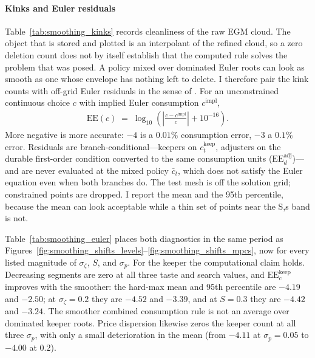 \paragraph{Kinks and Euler residuals}
\label{subsec:ModelBasicEuler}

Table~\ref{tab:smoothing_kinks} records cleanliness of the raw EGM cloud. The object that is stored and plotted is an interpolant of the refined cloud, so a zero deletion count does not by itself establish that the computed rule solves the problem that was posed. A policy mixed over dominated Euler roots can look as smooth as one whose envelope has nothing left to delete. I therefore pair the kink counts with off-grid Euler residuals in the sense of \citet{Judd1992-sp}. For an unconstrained continuous choice $c$ with implied Euler consumption $c^{\mathrm{impl}}$,
\begin{align}
	\mathrm{EE}(c)
	\;=\;
	\log_{10}\!\left(
		\left\lvert \frac{c - c^{\mathrm{impl}}}{c} \right\rvert
		+ 10^{-16}
	\right).
	\label{eq:judd_ee}
\end{align}
More negative is more accurate: $-4$ is a $0.01\%$ consumption error, $-3$ a $0.1\%$ error. Residuals are branch-conditional---keepers on $c_t^{\mathrm{keep}}$, adjusters on the durable first-order condition converted to the same consumption units ($\mathrm{EE}_d^{\mathrm{adj}}$)---and are never evaluated at the mixed policy $\bar c_t$, which does not satisfy the Euler equation even when both branches do. The test mesh is off the solution grid; constrained points are dropped. I report the mean and the 95th percentile, because the mean can look acceptable while a thin set of points near the S,s band is not.

Table~\ref{tab:smoothing_euler} places both diagnostics in the same period as Figures~\ref{fig:smoothing_shifts_levels}--\ref{fig:smoothing_shifts_mpcs}, now for every listed magnitude of $\sigma_\zeta$, $S$, and $\sigma_p$. For the keeper the computational claim holds. Decreasing segments are zero at all three taste and search values, and $\mathrm{EE}_c^{\mathrm{keep}}$ improves with the smoother: the hard-max mean and 95th percentile are $-4.19$ and $-2.50$; at $\sigma_\zeta=0.2$ they are $-4.52$ and $-3.39$, and at $S=0.3$ they are $-4.42$ and $-3.24$. The smoother combined consumption rule is not an average over dominated keeper roots. Price dispersion likewise zeros the keeper count at all three $\sigma_p$, with only a small deterioration in the mean (from $-4.11$ at $\sigma_p=0.05$ to $-4.00$ at $0.2$).

